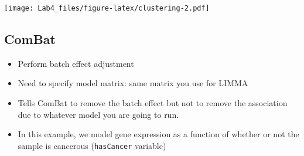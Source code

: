 \documentclass[
]{article}
\newenvironment{Shaded}{\begin{snugshade}}{\end{snugshade}}
\newcommand{\DataTypeTok}[1]{\textcolor[rgb]{0.13,0.29,0.53}{#1}}
\newcommand{\DecValTok}[1]{\textcolor[rgb]{0.00,0.00,0.81}{#1}}
\newcommand{\FloatTok}[1]{\textcolor[rgb]{0.00,0.00,0.81}{#1}}
\newcommand{\KeywordTok}[1]{\textcolor[rgb]{0.13,0.29,0.53}{\textbf{#1}}}
\newcommand{\NormalTok}[1]{#1}
\newcommand{\OperatorTok}[1]{\textcolor[rgb]{0.81,0.36,0.00}{\textbf{#1}}}
\newcommand{\StringTok}[1]{\textcolor[rgb]{0.31,0.60,0.02}{#1}}
\providecommand{\tightlist}{%
  \setlength{\itemsep}{0pt}\setlength{\parskip}{0pt}}
\begin{document}
\begin{Shaded}
\end{Shaded}

\texttt{[image: Lab4\_files/figure-latex/clustering-2.pdf]}

\hypertarget{combat}{%
\subsection{ComBat}\label{combat}}

\begin{itemize}
\tightlist
\item
  Perform batch effect adjustment
\item
  Need to specify model matrix: same matrix you use for LIMMA
\item
  Tells ComBat to remove the batch effect but not to remove the
  association due to whatever model you are going to run.
\item
  In this example, we model gene expression as a function of whether or
  not the sample is cancerous (\texttt{hasCancer} variable)
\end{itemize}

\begin{Shaded}
\end{Shaded}
\end{document}
